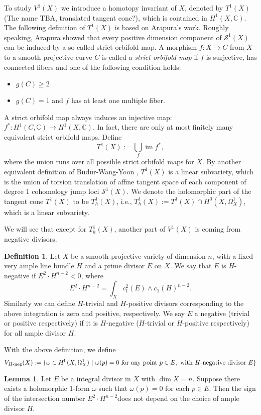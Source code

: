\documentclass[a4paper,12pt,reqno]{amsart}
\theoremstyle{plain}
\theoremstyle{definition}
\newtheorem{definition}[theorem]{Definition}
\newtheorem{lemma}[theorem]{Lemma}
\theoremstyle{remark}
\newcommand{\C}{\mathbb C}
\newcommand{\im}{\operatorname{im}}
\begin{document}
To study $V^1(X)$ we introduce a homotopy invariant of $X$, denoted by $T^1(X)${\color{red} (The name TBA, translated tangent cone?)}, which is contained in $H^1(X, \C)$. The following definition of $T^1(X)$ is based on Arapura's work. Roughly speaking, Arapura \cite{Ara97} showed that every positive dimension component of $\mathcal{S}^1(X)$ can be induced by a so called strict orbifold map. A morphism $f:X\to C$ from $X$ to a smooth projective curve $C$ is called a  {\it strict orbifold map} if $f $ is surjective, has connected fibers and one of the following condition holds:
\begin{itemize}
\item $g(C)\geq 2$
\item $g(C)=1$ and $f$ has at least one multiple fiber.
\end{itemize}
A strict orbifold map always induces an injective map: $f^*: H^1(C, \C) \to H^1(X,\C)$. In fact, there are only at most finitely many equivalent strict orbifold maps. Define $$T^1(X):= \bigcup_f \im f^*,$$
where the union runs over all possible strict orbifold maps for $X$. By another equivalent definition of Budur-Wang-Yoon \cite{BWY16} , $T^1(X)$ is a linear subvariety, which is the union of torsion translation of affine tangent space of each component of degree 1 cohomology jump loci $\mathcal{S}^1(X)$. We denote the holomorphic part of the tangent cone $T^1(X)$ to be $T^1_h(X)$, i.e., $T_h^1(X):=T^1(X)\cap H^0(X, \Omega_X^1)$, which is a linear subvariety.

We will see that except for $T_h^1(X)$, another part of $V^1(X)$ is coming from negative divisors.
\begin{definition}
Let $X$ be a smooth projective variety of dimension $n$, with a fixed very ample line bundle $H$ and a prime divisor $E$ on $X$. We say that $E$ is $H$-negative if $E^2\cdot H^{n-2}<0$, where $$E^2\cdot H^{n-2}=\int_X c_1^2(E)\wedge c_1(H)^{n-2}.$$ Similarly we can define $H$-trivial and $H$-positive divisors corresponding to the above integration is zero and positive, respectively. We say $E$ a negative (trivial or positive respectively) if it is $H$-negative ($H$-trivial or $H$-positive respectively) for all ample divisor $H$.
\end{definition}  
With the above definition, we define $$V_{H\textnormal{-neg}}(X):=\{\omega\in H^0(X, \Omega_X^1)\ |\ \omega(p)=0\  \textnormal{for any point}\ p\in E, \ \textnormal{with $H$-negative divisor}\  E\}$$  

\begin{lemma}\label{lem:welldef}
Let $E$ be a integral divisor in $X$ with $\dim X=n$. Suppose there exists a holomorphic 1-form $\omega$ such that $\omega(p)=0$ for each $p\in E$. Then the sign of the intersection number $E^2\cdot H^{n-2}$does not depend on the choice of ample divisor $H$.
\end{lemma}
\end{document}
